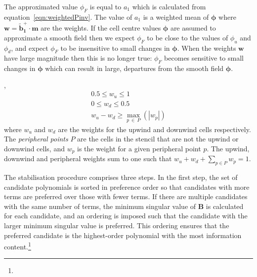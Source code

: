 The approximated value $\phi_F$ is equal to $a_1$ which is calculated from equation~\eqref{eqn:weightedPinv}.  The value of $a_1$ is a weighted mean of $\bm{\phi}$ where $\mathbf{w} = \mathbf{\tilde{b}_1^+} \cdot \mathbf{m}$ are the weights.
If the cell centre values $\bm{\phi}$ are assumed to approximate a smooth field then we expect $\phi_F$ to be close to the values of $\phi_u$ and $\phi_d$, and expect $\phi_F$ to be insensitive to small changes in $\bm{\phi}$.  When the weights $\mathbf{w}$ have large magnitude then this is no longer true: $\phi_F$ becomes sensitive to small changes in $\bm{\phi}$ which can result in large,  departures from the smooth field $\bm{\phi}$.

,
\begin{subequations}
\label{eqn:stability}
\begin{align}
	0.5 \leq w_u \leq 1 \label{eqn:stabilityU} \\
	0 \leq w_d \leq 0.5 \label{eqn:stabilityD} \\
	w_u - w_d \geq \max_{p\:\in\:P}(|w_p|)
\end{align}
\end{subequations}
where $w_u$ and $w_d$ are the weights for the upwind and downwind cells respectively.  The \textit{peripheral points} $P$ are the cells in the stencil that are not the upwind or downwind cells, and $w_p$ is the weight for a given peripheral point $p$.
 The upwind, downwind and peripheral weights sum to one such that $w_u + w_d + \sum_{p \in P} w_p = 1$.

The stabilisation procedure comprises three steps.  In the first step, the set of candidate polynomials is sorted in preference order so that candidates with more terms are preferred over those with fewer terms.
If there are multiple candidates with the same number of terms, the minimum singular value of $\mathbf{B}$ is calculated for each candidate, and an ordering is imposed such that the candidate with the larger minimum singular value is preferred.  This ordering ensures that the preferred candidate is the highest-order polynomial with the most information content.\footnote{}

